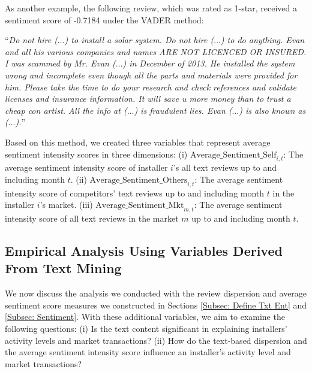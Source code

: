 \documentclass[msom,blindrev]{informs3}
\begin{document}
	As another example, the following review, which was rated as 1-star, received a sentiment score of -0.7184 under the VADER method:
	
	``\textit{Do not hire ($\ldots$)  to install a solar system. Do not hire ($\ldots$) to do anything. Evan and all his various companies and names  ARE NOT LICENCED OR INSURED. I was scammed by Mr. Evan ($\ldots$) in December of 2013. He installed the system wrong and incomplete even though all the parts and materials were provided for him. Please take the time to do your research and check references and validate licenses and insurance information. It will save u more money than to trust a cheap con artist. All the info at ($\ldots$)  is fraudulent lies. Evan ($\ldots$) is also known as ($\ldots$).}''
	
	Based on this method, we created three variables that represent average sentiment intensity scores in three dimensions: (i) $\text{Average\_Sentiment\_Self}_{i,t}$: The average sentiment intensity score of installer $i$'s all text reviews up to and including month $t$. (ii) $\text{Average\_Sentiment\_Others}_{i,t}$: The average sentiment intensity score of competitors' text reviews up to and including month $t$ in the installer $i$'s market. (iii) $\text{Average\_Sentiment\_Mkt}_{m,t}$: The average sentiment intensity score of all text reviews in the market $m$ up to and including month $t$.
	
\subsection{Empirical Analysis Using Variables Derived From Text Mining}
	
	We now discuss the analysis we conducted with the review dispersion and average sentiment score measures we constructed in Sections \ref{Subsec: Define Txt Ent} and \ref{Subsec: Sentiment}. With these additional variables, we aim to examine the following questions: (i) Is the text content significant in explaining installers' activity levels and market transactions? (ii) How do the text-based dispersion and the average sentiment intensity score influence an installer's activity level and market transactions? %

\end{document}
